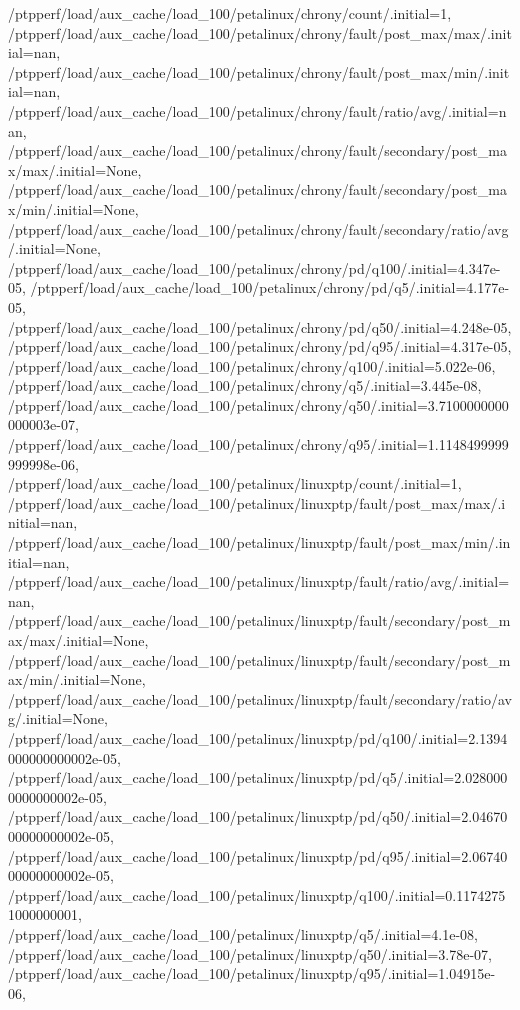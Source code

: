 {    /ptpperf/load/aux_cache/load_100/petalinux/chrony/count/.initial=1,
    /ptpperf/load/aux_cache/load_100/petalinux/chrony/fault/post_max/max/.initial=nan,
    /ptpperf/load/aux_cache/load_100/petalinux/chrony/fault/post_max/min/.initial=nan,
    /ptpperf/load/aux_cache/load_100/petalinux/chrony/fault/ratio/avg/.initial=nan,
    /ptpperf/load/aux_cache/load_100/petalinux/chrony/fault/secondary/post_max/max/.initial=None,
    /ptpperf/load/aux_cache/load_100/petalinux/chrony/fault/secondary/post_max/min/.initial=None,
    /ptpperf/load/aux_cache/load_100/petalinux/chrony/fault/secondary/ratio/avg/.initial=None,
    /ptpperf/load/aux_cache/load_100/petalinux/chrony/pd/q100/.initial=4.347e-05,
    /ptpperf/load/aux_cache/load_100/petalinux/chrony/pd/q5/.initial=4.177e-05,
    /ptpperf/load/aux_cache/load_100/petalinux/chrony/pd/q50/.initial=4.248e-05,
    /ptpperf/load/aux_cache/load_100/petalinux/chrony/pd/q95/.initial=4.317e-05,
    /ptpperf/load/aux_cache/load_100/petalinux/chrony/q100/.initial=5.022e-06,
    /ptpperf/load/aux_cache/load_100/petalinux/chrony/q5/.initial=3.445e-08,
    /ptpperf/load/aux_cache/load_100/petalinux/chrony/q50/.initial=3.7100000000000003e-07,
    /ptpperf/load/aux_cache/load_100/petalinux/chrony/q95/.initial=1.1148499999999998e-06,
    /ptpperf/load/aux_cache/load_100/petalinux/linuxptp/count/.initial=1,
    /ptpperf/load/aux_cache/load_100/petalinux/linuxptp/fault/post_max/max/.initial=nan,
    /ptpperf/load/aux_cache/load_100/petalinux/linuxptp/fault/post_max/min/.initial=nan,
    /ptpperf/load/aux_cache/load_100/petalinux/linuxptp/fault/ratio/avg/.initial=nan,
    /ptpperf/load/aux_cache/load_100/petalinux/linuxptp/fault/secondary/post_max/max/.initial=None,
    /ptpperf/load/aux_cache/load_100/petalinux/linuxptp/fault/secondary/post_max/min/.initial=None,
    /ptpperf/load/aux_cache/load_100/petalinux/linuxptp/fault/secondary/ratio/avg/.initial=None,
    /ptpperf/load/aux_cache/load_100/petalinux/linuxptp/pd/q100/.initial=2.1394000000000002e-05,
    /ptpperf/load/aux_cache/load_100/petalinux/linuxptp/pd/q5/.initial=2.0280000000000002e-05,
    /ptpperf/load/aux_cache/load_100/petalinux/linuxptp/pd/q50/.initial=2.0467000000000002e-05,
    /ptpperf/load/aux_cache/load_100/petalinux/linuxptp/pd/q95/.initial=2.0674000000000002e-05,
    /ptpperf/load/aux_cache/load_100/petalinux/linuxptp/q100/.initial=0.11742751000000001,
    /ptpperf/load/aux_cache/load_100/petalinux/linuxptp/q5/.initial=4.1e-08,
    /ptpperf/load/aux_cache/load_100/petalinux/linuxptp/q50/.initial=3.78e-07,
    /ptpperf/load/aux_cache/load_100/petalinux/linuxptp/q95/.initial=1.04915e-06,
}
